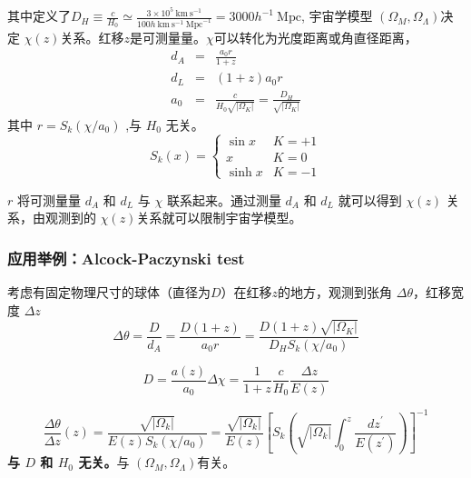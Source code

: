 \documentclass[12pt]{ctexart}
\begin{document}
其中定义了$D_H\equiv\frac{c}{H_0}\simeq\frac{3\times10^5 \mathrm{~km} \mathrm{~s}^{-1}}{100 h \mathrm{~km} \mathrm{~s}^{-1} \mathrm{~Mpc}^{-1}} = 3000 h^{-1}  \mathrm{~Mpc}$,
宇宙学模型 $\left(\Omega_M, \Omega_\Lambda\right) $决定 $\chi(z)$关系。红移$z$是可测量量。$\chi$可以转化为光度距离或角直径距离，
\begin{eqnarray}
    d_A &=& \frac{a_0 r}{1+z}
    \\ d_L &=& (1+z) a_0 r
    \\ a_0 &=& \frac{c}{H_0\sqrt{|\Omega_K|} } = \frac{D_H}{\sqrt{|\Omega_K|}} 
\end{eqnarray}
其中 
$r = S_k(\chi/a_0)$ ,与 $H_0$ 无关。 
\begin{equation}
    S_k(x) = 
    \begin{cases}
        \sin x & K=+1 \\ 
        x & K=0 \\ 
        \sinh x & K=-1
    \end{cases}
\end{equation}

$r$ 将可测量量 $d_A$ 和 $d_L$ 与  $\chi$ 联系起来。通过测量 $d_A$ 和 $d_L$ 就可以得到 $\chi(z)$ 关系，由观测到的 $\chi(z)$关系就可以限制宇宙学模型。

\subsubsection{应用举例：Alcock-Paczynski test}

考虑有固定物理尺寸的球体（直径为$D$）在红移$z$的地方，观测到张角 $\Delta \theta$，红移宽度 $\Delta z$  
\begin{equation}
    \Delta \theta = \frac{D }{d_A} = \frac{D(1+z)}{a_0r} = \frac{D(1+z)\sqrt{|\Omega_K|}}{D_H S_k(\chi/a_0)}
\end{equation}

\begin{equation}
    D=\frac{a(z)}{a_{0}} \Delta \chi=\frac{1}{1+z} \frac{c}{H_{0}} \frac{\Delta z}{E(z)}
\end{equation}

\begin{equation}
    \frac{\Delta \theta}{\Delta z}(z)=\frac{\sqrt{\left|\Omega_{k}\right|}}{E(z) S_{k}\left(\chi / a_{0}\right)}=\frac{\sqrt{\left|\Omega_{k}\right|}}{E(z)}\left[S_k\left(\sqrt{\left|\Omega_{k}\right|} \int_{0}^{z} \frac{d z^{\prime}}{E\left(z^{\prime}\right)}\right)\right]^{-1}
\end{equation}
\textbf{与 $D$ 和 $ H_0$ 无关。}与 $\left(\Omega_M, \Omega_\Lambda\right) $有关。
\end{document}
